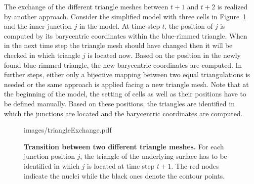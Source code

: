 \documentclass[11pt,a4paper, draft]{article}
\begin{document}
The exchange of the different triangle meshes between $t+1$ and $t+2$ is realized by another approach. Consider the simplified model with three cells in Figure~\ref{fig:triangleExchange} and the inner junction $j$ in the model. At time step $t$, the position of $j$ is computed by its barycentric coordinates within the blue-rimmed triangle. When in the next time step the triangle mesh should have changed then it will be checked in which triangle $j$ is located now. Based on the position in the newly found blue-rimmed triangle, the new barycentric coordinates are computed. In further steps, either only a bijective mapping between two equal triangulations is needed or the same approach is applied facing a new triangle mesh. Note that at the beginning of the model, the setting of cells as well as their positions have to be defined manually. Based on these positions, the triangles are identified in which the junctions are located and the barycentric coordinates are computed.
%
\begin{figure}[htbp]
	\begin{center}
		\begin{overpic}[width=0.8\linewidth]{images/triangleExchange.pdf}
		\end{overpic}
\caption[Transition between two different triangle meshes.]
{
{\bf Transition between two different triangle meshes.} For each junction position $j$, the triangle of the underlying surface has to be identified in which $j$ is located at time step $t+1$. The red nodes indicate the nuclei while the black ones denote the contour points.
}
	\label{fig:triangleExchange}
	\end{center}
\end{figure}
%
\end{document}
